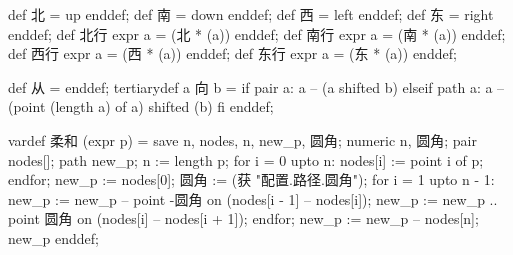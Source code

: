 \startMPinclusions[+]
def 北 = up enddef; def 南 = down enddef;
def 西 = left enddef; def 东 = right enddef;
def 北行 expr a = (北 * (a)) enddef;
def 南行 expr a = (南 * (a)) enddef;
def 西行 expr a = (西 * (a)) enddef;
def 东行 expr a = (东 * (a)) enddef;

def 从 = enddef;
tertiarydef a 向 b =
  if pair a:
    a -- (a shifted b)
  elseif path a:
    a -- (point (length a) of a) shifted (b)
  fi
enddef;
\stopMPinclusions

\startMPinclusions[+]
vardef 柔和 (expr p) =
  save n, nodes, n, new_p, 圆角; 
  numeric n, 圆角; pair nodes[]; path new_p;
  n := length p;
  for i = 0 upto n:
    nodes[i] := point i of p;
  endfor;
  new_p := nodes[0];
  圆角 := (获 "配置.路径.圆角");
  for i = 1 upto n - 1:
    new_p := new_p -- point -圆角 on (nodes[i - 1] -- nodes[i]);
    new_p := new_p .. point 圆角 on (nodes[i] -- nodes[i + 1]);
  endfor;
  new_p := new_p -- nodes[n];
  new_p
enddef;
\stopMPinclusions
